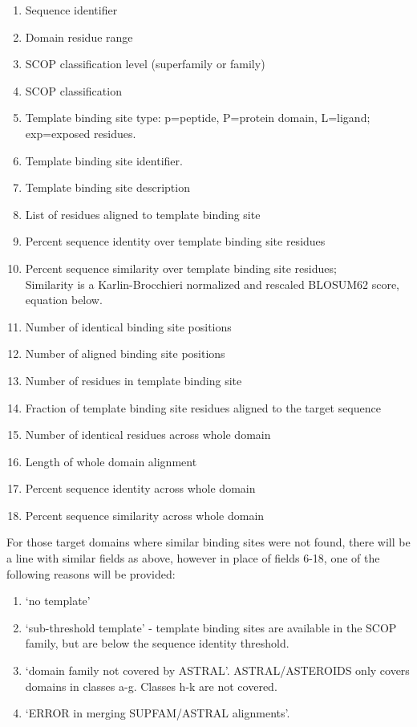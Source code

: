 \documentclass[11pt]{article}
\begin{document}
\begin{enumerate}
\item Sequence identifier
\item Domain residue range
\item SCOP classification level (superfamily or family)
\item SCOP classification
\item Template binding site type: p=peptide, P=protein domain, L=ligand; exp=exposed residues.
\item Template binding site identifier.
\item Template binding site description
\item List of residues aligned to template binding site
\item Percent sequence identity over template binding site residues
\item Percent sequence similarity over template binding site residues;\\Similarity is a Karlin-Brocchieri normalized and rescaled BLOSUM62 score, equation below.
\item Number of identical binding site positions
\item Number of aligned binding site positions
\item Number of residues in template binding site
\item Fraction of template binding site residues aligned to the target sequence
\item Number of identical residues across whole domain
\item Length of whole domain alignment
\item Percent sequence identity across whole domain
\item Percent sequence similarity across whole domain
\end{enumerate}

For those target domains where similar binding sites were not found, there will be a line with similar fields as above, however in place of fields 6-18, one of the following reasons will be provided:
\begin{enumerate}
\item `no template'

\item `sub-threshold template' - template binding sites are available in the SCOP family, but are below the sequence identity threshold.

\item `domain family not covered by ASTRAL'. ASTRAL/ASTEROIDS only covers domains in classes a-g. Classes h-k are not covered.

\item `ERROR in merging SUPFAM/ASTRAL alignments'.
\end{enumerate}
\end{document}
